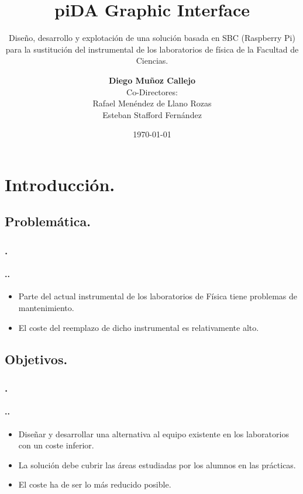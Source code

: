 \documentclass{beamer}
\newenvironment{slide}	%
{\begin{frame}[environment=slide]
\frametitle{\insertsectionnumber.\insertsection}
\framesubtitle{\setlength{\parindent}{2ex} \insertsectionnumber.\insertsubsectionnumber.\insertsubsection}}
{\end{frame}}
\begin{document}
\title[piDA Graphic Interface]{piDA Graphic Interface\\[2ex]}
\subtitle{Diseño, desarrollo y explotación de una solución basada en SBC (Raspberry Pi) para la sustitución del instrumental de los laboratorios de física de la Facultad de Ciencias.}   
\author[Diego Muñoz Callejo]{\textbf{Diego Muñoz Callejo}\\[1ex] \footnotesize Co-Directores:\\ Rafael Menéndez de Llano Rozas \\ Esteban Stafford Fernández}
\date{\today} 

\frame{\titlepage}


\section{Introducción.}

\subsection{Problemática.}
\begin{slide}
	\begin{itemize}
		\item Parte del actual instrumental de los laboratorios de Física tiene problemas de mantenimiento.
		\item El coste del reemplazo de dicho instrumental es relativamente alto.   
	\end{itemize}
\end{slide}


\subsection{Objetivos.}
\begin{slide}
	\begin{itemize}
		\item Diseñar y desarrollar una alternativa al equipo existente en los laboratorios con un coste inferior.
		\item La solución debe cubrir las áreas estudiadas por los alumnos en las prácticas.
		\item El coste ha de ser lo más reducido posible.
	\end{itemize}
\end{slide}
\end{document}
